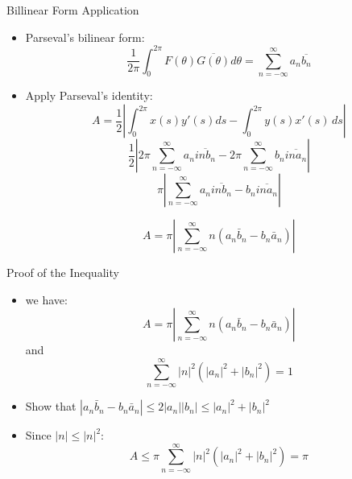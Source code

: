 \documentclass{beamer}
\begin{document}
\begin{frame}{Billinear Form Application}
    \begin{itemize}
    \item Parseval's bilinear form:
       \begin{equation}
       \frac{1}{2\pi} \int_{0}^{2\pi} F(\theta) \overline{G(\theta)} d\theta = \sum_{n=-\infty}^{\infty} a_n \overline{b_n}
    \end{equation}
    \item Apply Parseval's identity:
       $$A = \frac{1}{2} \left| \int_{0}^{2\pi} x(s)y'(s) ds - \int_{0}^{2\pi} y(s)x'(s) \, ds \right|$$
       $$ \frac{1}{2}\left| 2\pi \sum_{n=-\infty}^{\infty}a_n \overline{inb_n} - 2\pi \sum_{n=-\infty}^{\infty} b_n \overline{ina_n}\right|$$
       $$ \pi \left| \sum_{n=-\infty}^{\infty}a_n \overline{inb_n} - b_n \overline{ina_n}\right|$$
       
       $$A = \pi \left| \sum_{n=-\infty}^{\infty} n(a_n \bar{b}_n - b_n \bar{a}_n) \right|$$
    \end{itemize}
\end{frame}
    
\begin{frame}{Proof of the Inequality}
    
    \begin{itemize}
        \item we have: $$A = \pi \left| \sum_{n=-\infty}^{\infty} n(a_n \bar{b}_n - b_n \bar{a}_n) \right|$$
        and 
         $$\sum_{n=-\infty}^{\infty} |n|^2 (|a_n|^2 + |b_n|^2) = 1$$
        \item Show that $|a_n\bar{b}_n - b_n\bar{a}_n| \leq 2|a_n||b_n| \leq |a_n|^2 + |b_n|^2$
        \item Since $|n| \leq |n|^2$:
        $$A \leq \pi \sum_{n=-\infty}^{\infty} |n|^2(|a_n|^2 + |b_n|^2) = \pi$$
    \end{itemize}
\end{frame}
\end{document}

